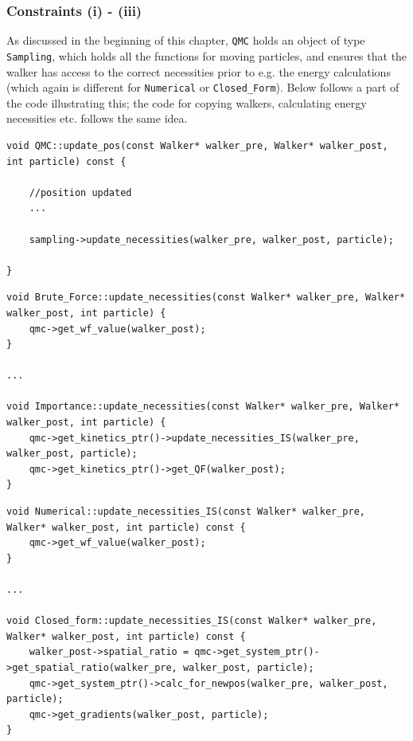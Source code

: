 \subsubsection{Constraints (i) - (iii)}

As discussed in the beginning of this chapter, \verb+QMC+ holds an object of type \verb+Sampling+, which holds all the functions for moving particles, and ensures that the walker has access to the correct necessities prior to e.g. the energy calculations (which again is different for \verb+Numerical+ or \verb+Closed_Form+). Below follows a part of the code illustrating this; the code for copying walkers, calculating energy necessities etc. follows the same idea.

\vspace{0.5cm}
\begin{lstlisting}
void QMC::update_pos(const Walker* walker_pre, Walker* walker_post, int particle) const {

    //position updated
    ...
      
    sampling->update_necessities(walker_pre, walker_post, particle);

}
\end{lstlisting}

\begin{lstlisting}
void Brute_Force::update_necessities(const Walker* walker_pre, Walker* walker_post, int particle) {
    qmc->get_wf_value(walker_post);
}

...

void Importance::update_necessities(const Walker* walker_pre, Walker* walker_post, int particle) {
    qmc->get_kinetics_ptr()->update_necessities_IS(walker_pre, walker_post, particle);
    qmc->get_kinetics_ptr()->get_QF(walker_post);
}
\end{lstlisting}

\begin{lstlisting}
void Numerical::update_necessities_IS(const Walker* walker_pre, Walker* walker_post, int particle) const {
    qmc->get_wf_value(walker_post);
}

...

void Closed_form::update_necessities_IS(const Walker* walker_pre, Walker* walker_post, int particle) const {
    walker_post->spatial_ratio = qmc->get_system_ptr()->get_spatial_ratio(walker_pre, walker_post, particle);
    qmc->get_system_ptr()->calc_for_newpos(walker_pre, walker_post, particle);
    qmc->get_gradients(walker_post, particle);
}
\end{lstlisting}

